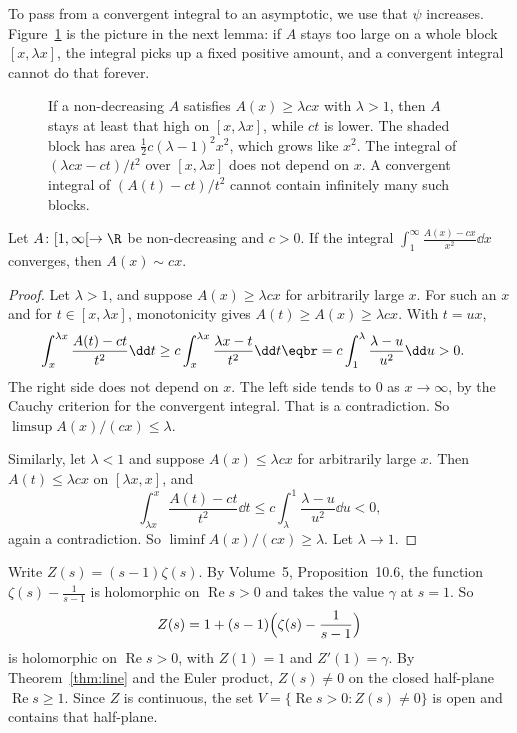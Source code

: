 To pass from a convergent integral to an asymptotic, we use that $\psi$ increases. Figure~\ref{fig:monobump} is the picture in the next lemma: if $A$ stays too large on a whole block $[x,\lambda x]$, the integral picks up a fixed positive amount, and a convergent integral cannot do that forever.

\begin{figure}[ht]
\centering
{}
\caption{If a non-decreasing $A$ satisfies $A(x)\ge\lambda cx$ with $\lambda>1$, then $A$ stays at least that high on $[x,\lambda x]$, while $ct$ is lower. The shaded block has area $\frac12 c(\lambda-1)^2 x^2$, which grows like $x^2$. The integral of $(\lambda cx-ct)/t^2$ over $[x,\lambda x]$ does not depend on $x$. A convergent integral of $(A(t)-ct)/t^2$ cannot contain infinitely many such blocks.}
\label{fig:monobump}
\end{figure}

\begin{lemma}\label{lem:monotone}
Let $A\colon[1,\infty[\to\R$ be non-decreasing and $c>0$. If the integral $\displaystyle\int_1^\infty\frac{A(x)-cx}{x^2}\dd x$ converges, then $A(x)\sim cx$.
\end{lemma}
\begin{proof}
Let $\lambda>1$, and suppose $A(x)\ge\lambda cx$ for arbitrarily large $x$. For such an $x$ and for $t\in[x,\lambda x]$, monotonicity gives $A(t)\ge A(x)\ge\lambda cx$. With $t=ux$,
\[
\begin{aligned}\int_x^{\lambda x}\frac{A(t)-ct}{t^2}\dd t&\ge c\int_x^{\lambda x}\frac{\lambda x-t}{t^2}\dd t\eqbr=c\int_1^\lambda\frac{\lambda-u}{u^2}\dd u>0.\end{aligned}
\]
The right side does not depend on $x$. The left side tends to $0$ as $x\to\infty$, by the Cauchy criterion for the convergent integral. That is a contradiction. So $\limsup A(x)/(cx)\le\lambda$.

Similarly, let $\lambda<1$ and suppose $A(x)\le\lambda cx$ for arbitrarily large $x$. Then $A(t)\le\lambda cx$ on $[\lambda x,x]$, and
\[
\int_{\lambda x}^x\frac{A(t)-ct}{t^2}\dd t\le c\int_\lambda^1\frac{\lambda-u}{u^2}\dd u<0,
\]
again a contradiction. So $\liminf A(x)/(cx)\ge\lambda$. Let $\lambda\to1$.
\end{proof}

Write $Z(s)=(s-1)\zeta(s)$. By Volume~5, Proposition~10.6, the function $\zeta(s)-\frac1{s-1}$ is holomorphic on $\operatorname{Re}s>0$ and takes the value $\gamma$ at $s=1$. So
\[
Z(s)=1+(s-1)\Bigl(\zeta(s)-\frac1{s-1}\Bigr)
\]
is holomorphic on $\operatorname{Re}s>0$, with $Z(1)=1$ and $Z'(1)=\gamma$. By Theorem~\ref{thm:line} and the Euler product, $Z(s)\ne0$ on the closed half-plane $\operatorname{Re}s\ge1$. Since $Z$ is continuous, the set $V=\{\operatorname{Re}s>0:Z(s)\ne0\}$ is open and contains that half-plane.

